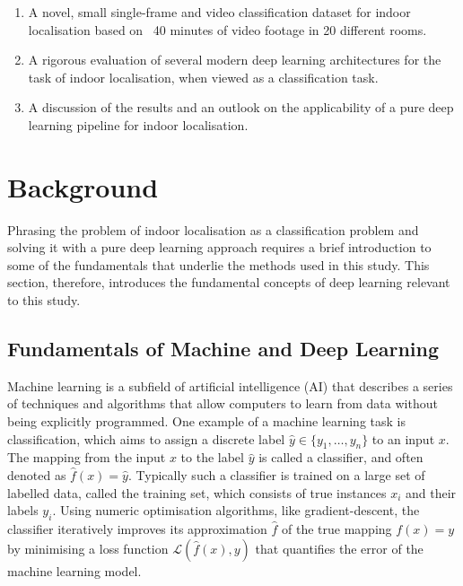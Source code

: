 \documentclass[a4paper]{article}
\begin{document}
\begin{enumerate} 

  \item A novel, small single-frame and video classification dataset for indoor
    localisation based on ~40 minutes of video footage in 20 different rooms.

  \item A rigorous evaluation of several modern deep learning architectures for
    the task of indoor localisation, when viewed as a classification task.

  \item A discussion of the results and an outlook on the applicability of a
    pure deep learning pipeline for indoor localisation.

\end{enumerate}


\section{Background} %
\label{sec:background}

Phrasing the problem of indoor localisation as a classification problem and
solving it with a pure deep learning approach requires a brief introduction to
some of the fundamentals that underlie the methods used in this study. This
section, therefore, introduces the fundamental concepts of deep learning
relevant to this study.

\subsection{Fundamentals of Machine and Deep Learning}

Machine learning is a subfield of artificial intelligence (AI) that describes a
series of techniques and algorithms that allow computers to learn from data
without being explicitly programmed. One example of a machine learning task is
classification, which aims to assign a discrete label $\hat{y} \in \{y_1,
\ldots, y_n\}$ to an input $x$. The mapping from the input $x$ to the label
$\hat{y}$ is called a classifier, and often denoted as $\hat{f}(x) = \hat{y}$.
Typically such a classifier is trained on a large set of labelled data, called
the training set, which consists of true instances $x_i$ and their labels $y_i$.
Using numeric optimisation algorithms, like gradient-descent, the classifier
iteratively improves its approximation $\hat{f}$ of the true mapping $f(x) = y$
by minimising a loss function $\mathcal{L}(\hat{f}(x), y)$ that quantifies the
error of the machine learning model.
\end{document}
